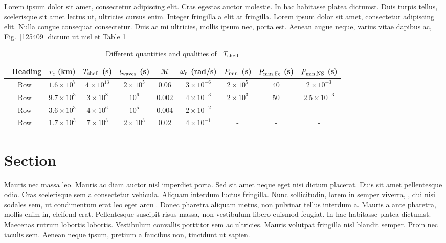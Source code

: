 \documentclass[11pt]{article}
\providecommand\citet{\cite}
\providecommand\citep{\cite}
\begin{document}
Lorem ipsum dolor sit amet, consectetur adipiscing elit. Cras egestas auctor molestie. In hac habitasse platea dictumst. Duis turpis tellus, scelerisque sit amet lectus ut, ultricies cursus enim. Integer fringilla a elit at fringilla. Lorem ipsum dolor sit amet, consectetur adipiscing elit. Nulla congue consequat consectetur. Duis ac mi ultricies, mollis ipsum nec, porta est. Aenean augue neque, varius vitae dapibus ac, Fig.~\ref{125409} dictum ut nisl et Table \ref{tab:table}
\begin{table*}
\caption{{\label{tab:table}Different quantities and qualities of ~$T_{\rm shell}$}}
\begin{center}
\begin{tabular}{ccccccccc}
\hline\
\textbf{Heading}& $r_c$ (km) & $T_{\rm shell}$ (s) & $t_{\rm waves}$ (s) & $\mathcal{M}$ & $\omega_{\rm c}$ (rad/s) & $P_{\rm min}$ (s) & $P_{\rm min,Fe}$ (s) & $P_{\rm min,NS}$ (s) \\
\hline
Row & $ 1.6 \times 10^7 $ & $ 4 \times 10^{13}$ & $ 2 \times 10^{5}$ & $0.06$ & $ 3 \times 10^{-6}$ & $ 2 \times 10^{5}$ & $ 40$ & $ 2 \times 10^{-3} $  \\
\hline
Row & $ 9.7 \times 10^3$ & $ 3 \times 10^8$ & $ 10^{6}$ & $0.002$ & $ 4 \times 10^{-3}$ & $ 2 \times 10^{3}$ & $ 50$ & $  2.5 \times 10^{-3} $ \\
\hline
Row & $ 3.6 \times 10^3$ & $ 4 \times 10^6$ & $ 10^{5}$ & $0.004$ & $ 2 \times 10^{-2}$ & - & - & - \\
\hline
Row & $ 1.7 \times 10^3$ & $ 7 \times 10^3$ &  $ 2 \times 10^{3}$ & $0.02$ & $ 4 \times 10^{-1}$ & - & - & - \\
\hline
\end{tabular}
\end{center}
\end{table*}



\section*{Section}
Mauris nec massa leo. Mauris ac diam auctor nisl imperdiet porta. Sed sit amet neque eget nisi dictum placerat. Duis sit amet pellentesque odio. Cras scelerisque sem a consectetur vehicula. Aliquam interdum luctus fringilla. Nunc sollicitudin, lorem in semper viverra, \citet{Goldreich_1990}, dui nisi sodales sem, ut condimentum erat leo eget arcu \citep{Goldreich_1990,Kumar_1994}. Donec pharetra aliquam metus, non pulvinar tellus interdum a. Mauris a ante pharetra, mollis enim in, eleifend erat. Pellentesque suscipit risus massa, non vestibulum libero euismod feugiat. In hac habitasse platea dictumst. Maecenas rutrum lobortis lobortis. Vestibulum convallis porttitor sem ac ultricies. Mauris volutpat fringilla nisl blandit semper. Proin nec iaculis sem. Aenean neque ipsum, pretium a faucibus non, tincidunt ut sapien.
\end{document}
